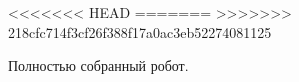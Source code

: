 \documentclass[12pt,a4paper,openany]{extarticle}
\begin{document}
\begin{figure}[h!]
<<<<<<< HEAD
=======
>>>>>>> 218cfc714f3cf26f388f17a0ac3eb52274081125
	\caption{Полностью собранный робот.}
	\label{fig:last_append_fig}
\end{figure}	
	
\end{document}
